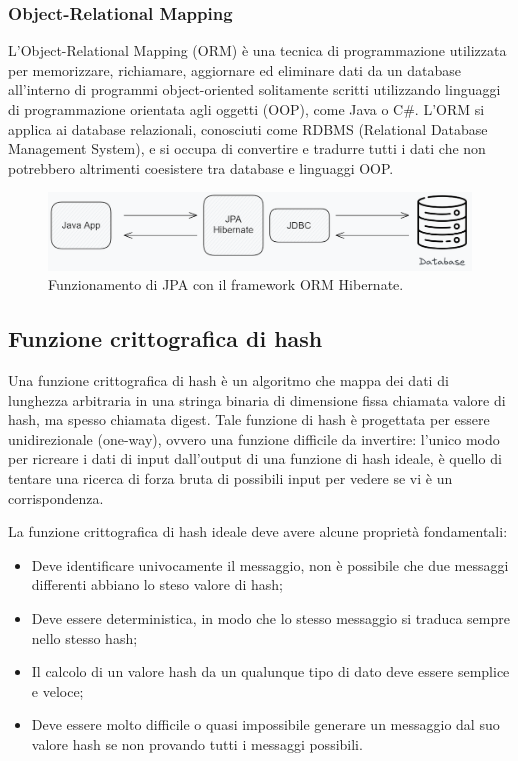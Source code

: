 \subsubsection{Object-Relational Mapping}
L'Object-Relational Mapping (ORM) è una tecnica di programmazione utilizzata per memorizzare, richiamare, aggiornare ed eliminare dati da un database all'interno di programmi object-oriented solitamente scritti utilizzando linguaggi di programmazione orientata agli oggetti (OOP), come Java o C\#.
L'ORM si applica ai database relazionali, conosciuti come RDBMS (Relational Database Management System), e si occupa di convertire e tradurre tutti i dati che non potrebbero altrimenti coesistere tra database e linguaggi OOP.\cite{orm}
\\
\begin{figure}[h]
    \centering
    \includegraphics[width=1.0\textwidth]{images/jpa hibernate.png}
    \caption{Funzionamento di JPA con il framework ORM Hibernate.}
    \label{fig:jpa-hibernate}
\end{figure}

\subsection{Funzione crittografica di hash}
Una funzione crittografica di hash è un algoritmo che mappa dei dati di lunghezza arbitraria in una stringa binaria di dimensione fissa chiamata valore di hash, ma spesso chiamata digest.
Tale funzione di hash è progettata per essere unidirezionale (one-way), ovvero una funzione difficile da invertire: l'unico modo per ricreare i dati di input dall'output di una funzione di hash ideale, è quello di tentare una ricerca di forza bruta di possibili input per vedere se vi è un corrispondenza. \cite{funzioneCrittografica}

La funzione crittografica di hash ideale deve avere alcune proprietà fondamentali:
\begin{itemize}
    \item Deve identificare univocamente il messaggio, non è possibile che due messaggi differenti abbiano lo steso valore di hash;
    \item Deve essere deterministica, in modo che lo stesso messaggio si traduca sempre nello stesso hash;
    \item Il calcolo di un valore hash da un qualunque tipo di dato deve essere semplice e veloce;
    \item Deve essere molto difficile o quasi impossibile generare un messaggio dal suo valore hash se non provando tutti i messaggi possibili.
\end{itemize}
\newpage
